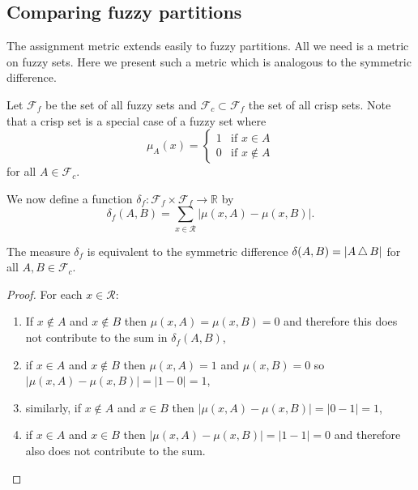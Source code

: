 \subsection{Comparing fuzzy partitions}
\label{sec:asgn-met-fuzzy-partitions}

The assignment metric extends easily to fuzzy partitions.  All we need is a
metric on fuzzy sets.  Here we present such a metric which is analogous to the
symmetric difference.

Let $\mathcal{F}_f$ be the set of all fuzzy sets and $\mathcal{F}_c \subset
\mathcal{F}_f$ the set of all crisp sets.  Note that a crisp set is a special
case of a fuzzy set where
\begin{equation*}
  \mu_A(x) =
  \begin{cases}
    1 & \text{if $x \in A$}\\
    0 & \text{if $x \notin A$}
  \end{cases}
\end{equation*}
for all $A \in \mathcal{F}_c$.

We now define a function $\delta_f \colon \mathcal{F}_f \times \mathcal{F}_f
\to \mathbb{R}$ by
\begin{equation*}
  \delta_f(A,B) = \sum_{x \in \mathcal{R}} |\mu(x,A) - \mu(x,B)|.
\end{equation*}

\begin{thm}
  The measure $\delta_f$ is equivalent to the symmetric difference
  $\delta(A,B) = |A \operatorname{\bigtriangleup} B|$ for all $A,B \in \mathcal{F}_c$.
\end{thm}

\begin{proof}
  For each $x \in \mathcal{R}$:
  \begin{enumerate}
  \item If $x \notin A$ and $x \notin B$ then $\mu(x,A) = \mu(x,B) = 0$ and
    therefore this does not contribute to the sum in $\delta_f(A,B)$,
  \item if $x \in A$ and $x \notin B$ then $\mu(x,A) = 1$ and $\mu(x,B) = 0$
    so $|\mu(x,A) - \mu(x,B)| = |1 - 0| = 1$,
  \item similarly, if $x \notin A$ and $x \in B$ then $|\mu(x,A) - \mu(x,B)|
    = |0 - 1| = 1$,
  \item if $x \in A$ and $x \in B$ then $|\mu(x,A) - \mu(x,B)| = |1 - 1| = 0$
    and therefore also does not contribute to the sum.
  \end{enumerate}
\end{proof}

